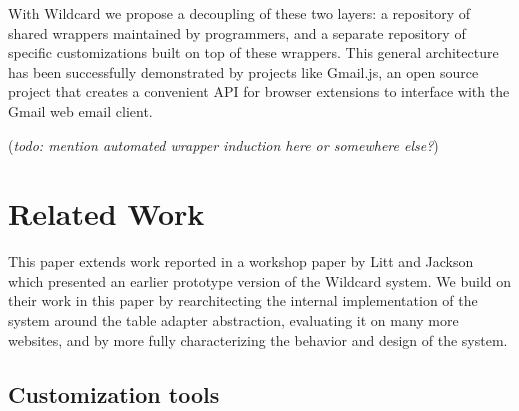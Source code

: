 \documentclass[sigplan,10pt,anonymous,review]{acmart}
\begin{document}
With Wildcard we propose a decoupling of these two layers: a repository
of shared wrappers maintained by programmers, and a separate repository
of specific customizations built on top of these wrappers. This general
architecture has been successfully demonstrated by projects like
Gmail.js, an open source project that creates a convenient API for
browser extensions to interface with the Gmail web email client.

(\emph{todo: mention automated wrapper induction here or somewhere
else?})

\hypertarget{sec:related-work}{%
\section{Related Work}\label{sec:related-work}}

This paper extends work reported in a workshop paper by Litt and Jackson
\citep{litt2020} which presented an earlier prototype version of the
Wildcard system. We build on their work in this paper by rearchitecting
the internal implementation of the system around the table adapter
abstraction, evaluating it on many more websites, and by more fully
characterizing the behavior and design of the system.

\hypertarget{customization-tools}{%
\subsection{Customization tools}\label{customization-tools}}
\end{document}
